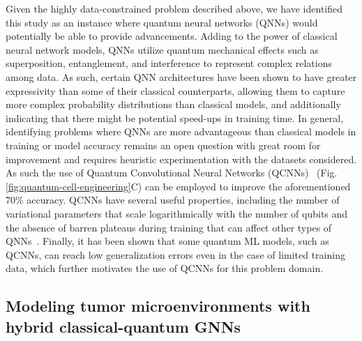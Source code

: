 \documentclass{article}
\begin{document}
Given the highly data-constrained problem described above, we have identified this study as an instance where quantum neural networks (QNNs) would potentially be able to provide advancements. Adding to the power of classical neural network models, QNNs utilize quantum mechanical effects such as superposition, entanglement, and interference to represent complex relations among data. As such, certain QNN architectures have been shown to have greater expressivity than some of their classical counterparts, allowing them to capture more complex probability distributions than classical models, and additionally indicating that there might be potential speed-ups in training time. In general, identifying problems where QNNs are more advantageous than classical models in training or model accuracy remains an open question with great room for improvement and requires heuristic experimentation with the datasets considered. As such the use of Quantum Convolutional Neural Networks (QCNNs)~\cite{cong2019quantum} (Fig. \ref{fig:quantum-cell-engineering}C) can be employed to improve the aforementioned 70\% accuracy. QCNNs have several useful properties, including the number of variational parameters that scale logarithmically with the number of qubits and the absence of barren plateaus during training that can affect other types of QNNs~\cite{pesah2021absence}. Finally, it has been shown that some quantum ML models, such as QCNNs, can reach low generalization errors even in the case of limited training data, which further motivates the use of QCNNs for this problem domain. 



\subsection{Modeling tumor microenvironments with hybrid classical-quantum GNNs }
\end{document}
